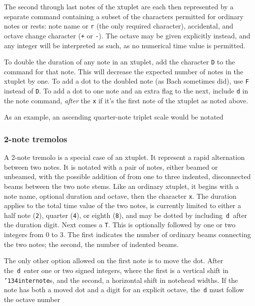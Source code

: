 \documentclass[11pt]{article}
\def\bs{{\tt\char'134}}
\def\newfrom{2.59}  %
\def\NEW#1{\ifdim#1 pt<\newfrom pt\else%
\marginpar{\fbox{#1}}\fi}
\begin{document}
The second through last notes of the xtuplet are each then 
represented by a separate command containing a subset of the characters 
permitted for ordinary notes or rests: note name or {\tt r} (the only required 
character), accidental, and octave change character ({\tt +} or {\tt -}). 
\NEW{1.4} The octave may be given explicitly instead, and any integer will be 
interpreted as such, as no numerical time value is permitted.

To double\NEW{2.3} the duration of any note in an xtuplet, add the 
character {\tt D} to the command for that note. This will decrease the expected
number of notes in the xtuplet by one.  To add a dot to the doubled note
(as Bach sometimes did), use {\tt F} instead of {\tt D}.  
\NEW{2.4}To add a dot to one  
note and an extra flag to the next, include {\tt d} in the note command,
{\it after} the {\tt x} if it's the first note of the xtuplet as noted above.   

As an example, an ascending quarter-note triplet scale would be 
notated\hfil{} 

\subsubsection{2-note tremolos}\label{TwoNoteT}

A 2-note tremolo \NEW{2.80}is a special case of an xtuplet. 
It represent a rapid alternation between two notes. 
It is notated with a pair of 
notes, either beamed or unbeamed, with the possible addition of from one to three 
indented, disconnected beams between the two note stems. 
Like an ordinary
xtuplet, it begins with a note name, optional duration and octave, then
the character {\tt x}. The duration applies to the total time value of the 
two notes, is currently limited to either a half note ({\tt 2}), 
quarter ({\tt 4}), or eighth ({\tt 8}), and may be dotted by including~{\tt d}~after
the duration digit. 
Next comes a {\tt T}. This is optionally followed by one or two
integers from 0 to 3. The first indicates the number of ordinary beams 
connecting the two notes; the second, the number of indented beams.

The only other option allowed on the first note is to move the dot. After 
the~{\tt d}~enter one or two signed integers, where the first 
is a vertical shift in {\tt \bs internote}s, and the second, a horizontal shift 
in notehead widths. If the note has both a moved dot and a digit for an explicit octave, 
the~{\tt d} must follow the octave number
\end{document}
